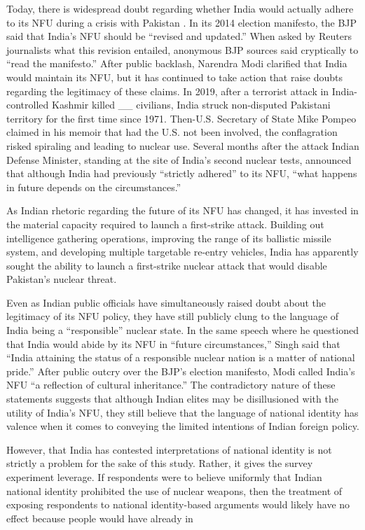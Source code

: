 \documentclass[12pt]{article}
\begin{document}
Today, there is widespread doubt regarding whether India would actually adhere to its NFU during a crisis with Pakistan \citep{clary_indias_2019}. In its 2014 election manifesto, the BJP said that India's NFU should be “revised and updated.” When asked by Reuters journalists what this revision entailed, anonymous BJP sources said cryptically to “read the manifesto.” After public backlash, Narendra Modi clarified that India would maintain its NFU, but it has continued to take action that raise doubts regarding the legitimacy of these claims. In 2019, after a terrorist attack in India-controlled Kashmir killed \_\_ civilians, India struck non-disputed Pakistani territory for the first time since 1971. Then-U.S. Secretary of State Mike Pompeo claimed in his memoir that had the U.S. not been involved, the conflagration risked spiraling and leading to nuclear use. Several months after the attack Indian Defense Minister, standing at the site of India's second nuclear tests, announced that although India had previously “strictly adhered” to its NFU, “what happens in future depends on the circumstances.”

As Indian rhetoric regarding the future of its NFU has changed, it has invested in the material capacity required to launch a first-strike attack. Building out intelligence gathering operations, improving the range of its ballistic missile system, and developing multiple targetable re-entry vehicles, India has apparently sought the ability to launch a first-strike nuclear attack that would disable Pakistan's nuclear threat.

Even as Indian public officials have simultaneously raised doubt about the legitimacy of its NFU policy, they have still publicly clung to the language of India being a “responsible” nuclear state. In the same speech where he questioned that India would abide by its NFU in “future circumstances,” Singh said that “India attaining the status of a responsible nuclear nation is a matter of national pride.” After public outcry over the BJP's election manifesto, Modi called India's NFU “a reflection of cultural inheritance.” The contradictory nature of these statements suggests that although Indian elites may be disillusioned with the utility of India's NFU, they still believe that the language of national identity has valence when it comes to conveying the limited intentions of Indian foreign policy.

However, that India has contested interpretations of national identity is not strictly a problem for the sake of this study. Rather, it gives the survey experiment leverage. If respondents were to believe uniformly that Indian national identity prohibited the use of nuclear weapons, then the treatment of exposing respondents to national identity-based arguments would likely have no effect because people would have already in\\
\end{document}
